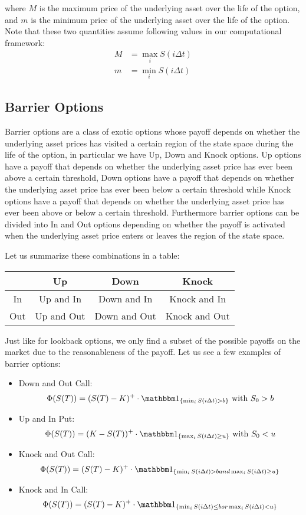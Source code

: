 where $M$ is the maximum price of the underlying asset over the life of the
option, and $m$ is the minimum price of the underlying asset over the life of
the option. Note that these two quantities assume following values in our
computational framework:
\begin{align*}
    M & = \max_i S(i\Delta t) \\
    m & = \min_i S(i\Delta t)
\end{align*}

\subsection*{Barrier Options}
Barrier options are a class of exotic options whose payoff depends on whether
the underlying asset prices has visited a certain region of the state space
during the life of the option, in particular we have Up, Down and Knock options.
Up options have a payoff that depends on whether the underlying asset price has
ever been above a certain threshold, Down options have a payoff that depends on
whether the underlying asset price has ever been below a certain threshold while
Knock options have a payoff that depends on whether the underlying asset price
has ever been above or below a certain threshold. Furthermore barrier options
can be divided into In and Out options depending on whether the payoff is
activated when the underlying asset price enters or leaves the region of the
state space.

Let us summarize these combinations in a table:

\begin{center}
    \begin{tabular}{|c|c|c|c|}
        \hline
        & Up & Down & Knock \\
        \hline
        In & Up and In & Down and In & Knock and In \\
        \hline
        Out & Up and Out & Down and Out & Knock and Out \\
        \hline
    \end{tabular}
\end{center}

Just like for lookback options, we only find a subset of the possible payoffs
on the market due to the reasonableness of the payoff. Let us see a few examples
of barrier options:

\begin{itemize}
    \item Down and Out Call:
        \[ \Phi(S(T)) = (S(T)-K)^+ \cdot \I_{\{ \min_i S(i\Delta t) > b \}}
        \text{ with } S_0 > b \]
    \item Up and In Put:
        \[ \Phi(S(T)) = (K-S(T))^+ \cdot \I_{\{ \max_i S(i\Delta t) \geq u \}}
        \text{ with } S_0 < u \]
    \item Knock and Out Call:
        \[ \Phi(S(T)) = (S(T)-K)^+ \cdot \I_{\{ \min_i S(i\Delta t) > b and
        \max_i S(i\Delta t) \geq u \}} \]
    \item Knock and In Call:
        \[ \Phi(S(T)) = (S(T)-K)^+ \cdot \I_{\{ \min_i S(i\Delta t) \leq b or
        \max_i S(i\Delta t) < u \}} \]
\end{itemize}

